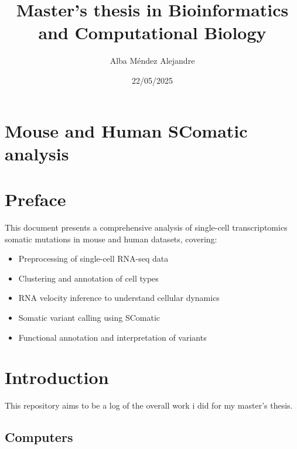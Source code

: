 \documentclass[
  letterpaper,
  DIV=11,
  numbers=noendperiod]{scrreprt}
\title{Master's thesis in Bioinformatics and Computational Biology}
\author{Alba Méndez Alejandre}
\date{22/05/2025}
\providecommand{\tightlist}{%
  \setlength{\itemsep}{0pt}\setlength{\parskip}{0pt}}\usepackage{longtable,booktabs,array}
\renewcommand*\contentsname{Table of contents}
\newcommand\contentsname{Table of contents}
\begin{document}
\maketitle

\renewcommand*\contentsname{Table of contents}
{
\hypersetup{linkcolor=}
\setcounter{tocdepth}{2}
\tableofcontents
}


\chapter{Mouse and Human SComatic
analysis}\label{mouse-and-human-scomatic-analysis}


\chapter*{Preface}\label{preface}


This document presents a comprehensive analysis of single-cell
transcriptomics somatic mutations in mouse and human datasets, covering:

\begin{itemize}
\tightlist
\item
  Preprocessing of single-cell RNA-seq data
\item
  Clustering and annotation of cell types
\item
  RNA velocity inference to understand cellular dynamics
\item
  Somatic variant calling using SComatic
\item
  Functional annotation and interpretation of variants
\end{itemize}


\chapter{Introduction}\label{introduction}

This repository aims to be a log of the overall work i did for my
master's thesis.

\section{Computers}\label{computers}
\end{document}

